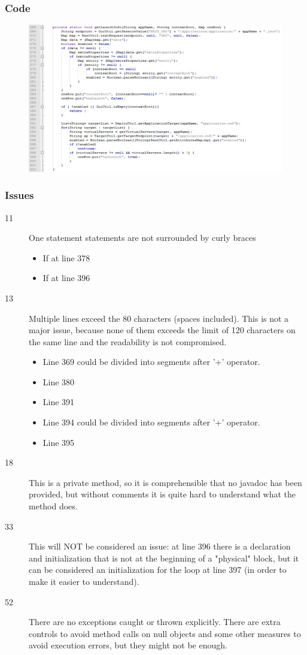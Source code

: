 		\subsubsection{Code}
		\begin{figure}[h!]
			\includegraphics[width=\textwidth]{../SE2_CODE/getlaunchinfo}
		\end{figure}
		\subsubsection{Issues}
		\begin{description}
			\item[11] One statement statements are not surrounded by curly braces
				\begin{itemize}
				\item If at line 378
				\item If at line 396
				\end{itemize}
			\item[13] Multiple lines exceed the 80 characters (spaces included).
				This is not a major issue, because none of them	exceeds the limit of 120 characters on the same line and
				the readability is not compromised.
				\begin{itemize}
					\item Line 369 could be divided into segments after '+' operator.
					\item Line 380
					\item Line 391
					\item Line 394 could be divided into segments after '+' operator.
					\item Line 395
				\end{itemize}
			\item[18] This is a private method, so it is comprehensible that no javadoc has been provided, but
			without comments it is quite hard to understand what the method does.
			\item[33] This will NOT be considered an issue: at line 396 there is a declaration and initialization
			that is not at the beginning of a "physical" block, but it can be considered an initialization
			for the loop at line 397 (in order to make it easier to understand).
			\item[52] There are no exceptions caught or thrown explicitly. There are extra controls to avoid method
			calls on null objects and some other measures to avoid execution errors, but they might not be enough.
		\end{description}
	\clearpage
